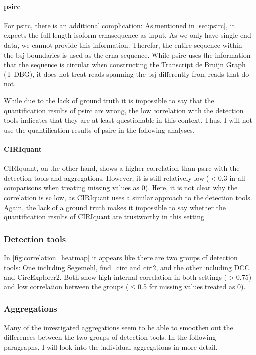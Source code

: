 \paragraph{psirc}
For psirc, there is an additional complication: As mentioned in
\cref{sec:psirc}, it expects the full-length isoform \gls{crna}sequence as
input.
As we only have single-end data, we cannot provide this information.
Therefor, the entire sequence within the \gls{bsj} boundaries is used as the
\gls{crna} sequence.
While psirc uses the information that the sequence is circular when
constructing the Transcript de Bruijn Graph (T-DBG), it does not treat reads
spanning the \gls{bsj} differently from reads that do
not\supercite{yu_quantifying_2021}.

While due to the lack of ground truth it is impossible to say that the
quantification results of psirc are wrong, the low correlation with the
detection tools indicates that they are at least questionable in this context.
Thus, I will not use the quantification results of psirc in the following
analyses.

\paragraph{CIRIquant}
CIRIquant, on the other hand, shows a higher correlation than psirc with the
detection tools and aggregations.
However, it is still relatively low ($<$0.3 in all comparisons when treating
missing values as 0).
Here, it is not clear why the correlation is so low, as CIRIquant uses a
similar approach to the detection tools.
Again, the lack of a ground truth makes it impossible to say whether the
quantification results of CIRIquant are trustworthy in this setting.

\subsubsection{Detection tools}
In \cref{fig:correlation_heatmap} it appears like there are two groups of
detection tools: One including Segemehl, find\_circ and ciri2, and the other
including DCC and CircExplorer2.
Both show high internal correlation in both settings ($>$0.75) and low
correlation between the groups ($\leq$0.5 for missing values treated as 0).


\subsubsection{Aggregations}
Many of the investigated aggregations seem to be able to smoothen out the
differences between the two groups of detection tools.
In the following paragraphs, I will look into the individual aggregations in
more detail.

